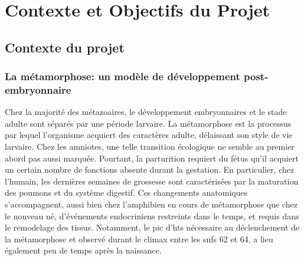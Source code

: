 \chapter{Contexte et Objectifs du Projet}



\section{Contexte du projet}


\subsection{La métamorphose: un modèle de développement post-embryonnaire}
Chez la majorité des métazoaires, le développement embryonnaires et le stade adulte sont séparés par une période larvaire.
La métamorphose est la processus par lequel l'organisme acquiert des caractères adulte, délaissant son style de vie larvaire.
Chez les amniotes, une telle transition écologique ne semble au premier abord pas aussi marquée.
Pourtant, la parturition requiert du fétus qu'il acquiert un certain nombre de fonctions absente durant la gestation.
En particulier, chez l'humain, les dernières semaines de grossesse sont caractérisées par la maturation des poumons et du système digestif.
Ces changements anatomiques s'accompagnent, aussi bien chez l'amphibien en cours de métamorphose que chez le nouveau né, d'événements endocriniens restreints dans le temps, et requis dans le remodelage des tissus.
Notamment, le pic d'\glspl{ht} nécessaire au déclenchement de la métamorphose et observé durant le climax entre les \glspl{snf} 62 et 64, a lieu également peu de temps après la naissance.


